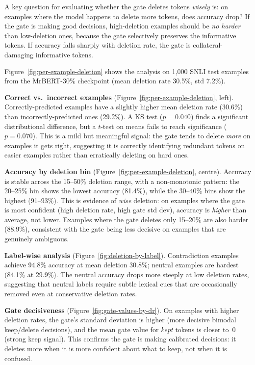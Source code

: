 \documentclass[11pt,a4paper]{article}
\begin{document}
A key question for evaluating whether the gate deletes tokens \emph{wisely} is: on examples where the model happens to delete more tokens, does accuracy drop? If the gate is making good decisions, high-deletion examples should be \emph{no harder} than low-deletion ones, because the gate selectively preserves the informative tokens. If accuracy falls sharply with deletion rate, the gate is collateral-damaging informative tokens.

Figure~\ref{fig:per-example-deletion} shows the analysis on 1,000 SNLI test examples from the MrBERT-30\% checkpoint (mean deletion rate 30.5\%, std 7.2\%).

\textbf{Correct vs.\ incorrect examples} (Figure~\ref{fig:per-example-deletion}, left). Correctly-predicted examples have a slightly higher mean deletion rate (30.6\%) than incorrectly-predicted ones (29.2\%). A KS test ($p=0.040$) finds a significant distributional difference, but a $t$-test on means fails to reach significance ($p=0.070$). This is a mild but meaningful signal: the gate tends to delete \emph{more} on examples it gets right, suggesting it is correctly identifying redundant tokens on easier examples rather than erratically deleting on hard ones.

\textbf{Accuracy by deletion bin} (Figure~\ref{fig:per-example-deletion}, centre). Accuracy is stable across the 15--50\% deletion range, with a non-monotonic pattern: the 20--25\% bin shows the lowest accuracy (81.4\%), while the 30--40\% bins show the highest (91--93\%). This is evidence of \emph{wise} deletion: on examples where the gate is most confident (high deletion rate, high gate std dev), accuracy is \emph{higher} than average, not lower. Examples where the gate deletes only 15--20\% are also harder (88.9\%), consistent with the gate being less decisive on examples that are genuinely ambiguous.

\textbf{Label-wise analysis} (Figure~\ref{fig:deletion-by-label}). Contradiction examples achieve 94.8\% accuracy at mean deletion 30.8\%; neutral examples are hardest (84.1\% at 29.9\%). The neutral accuracy drops more steeply at low deletion rates, suggesting that neutral labels require subtle lexical cues that are occasionally removed even at conservative deletion rates.

\textbf{Gate decisiveness} (Figure~\ref{fig:gate-values-by-dr}). On examples with higher deletion rates, the gate's standard deviation is higher (more decisive bimodal keep/delete decisions), and the mean gate value for \emph{kept} tokens is closer to~0 (strong keep signal). This confirms the gate is making calibrated decisions: it deletes more when it is more confident about what to keep, not when it is confused.
\end{document}

